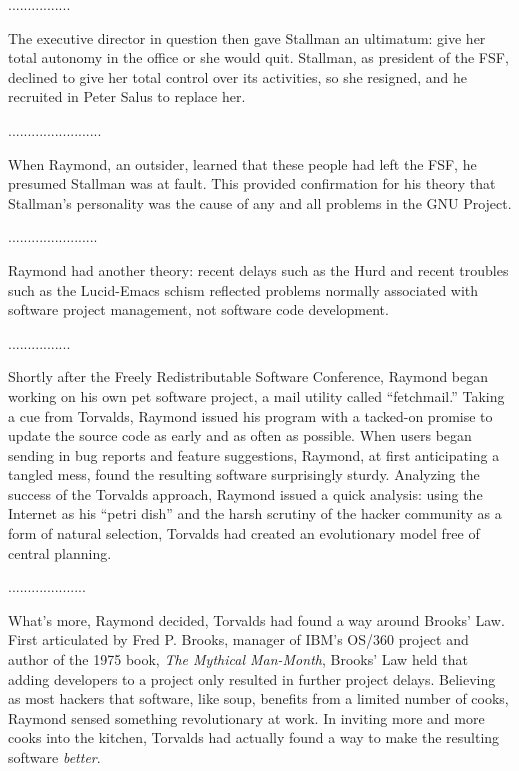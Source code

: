 \ifdefined\chs
................
\fi

\ifdefined\eng
The executive director in question then gave Stallman an ultimatum: give her total autonomy in the office or she would quit.  Stallman, as president of the FSF, declined to give her total control over its activities, so she resigned, and he recruited in Peter Salus to replace her.
\fi

\ifdefined\chs
........................
\fi

\ifdefined\eng
When Raymond, an outsider, learned that these people had left the FSF, he presumed Stallman was at fault.  This provided confirmation for his theory that Stallman's personality was the cause of any and all problems in the GNU Project.
\fi

\ifdefined\chs
.......................
\fi

\ifdefined\eng
Raymond had another theory: recent delays such as the Hurd and recent troubles such as the Lucid-Emacs schism reflected problems normally associated with software project management, not software code development.
\fi

\ifdefined\chs
................
\fi

\ifdefined\eng
Shortly after the Freely Redistributable Software Conference, Raymond began working on his own pet software project, a mail utility called ``fetchmail.'' Taking a cue from Torvalds, Raymond issued his program with a tacked-on promise to update the source code as early and as often as possible. When users began sending in bug reports and feature suggestions, Raymond, at first anticipating a tangled mess, found the resulting software surprisingly sturdy. Analyzing the success of the Torvalds approach, Raymond issued a quick analysis: using the Internet as his ``petri dish'' and the harsh scrutiny of the hacker community as a form of natural selection, Torvalds had created an evolutionary model free of central planning.
\fi

\ifdefined\chs
....................
\fi

\ifdefined\eng
What's more, Raymond decided, Torvalds had found a way around Brooks' Law. First articulated by Fred P. Brooks, manager of IBM's OS/360 project and author of the 1975 book, \textit{The Mythical Man-Month}, Brooks' Law held that adding developers to a project only resulted in further project delays. Believing as most hackers that software, like soup, benefits from a limited number of cooks, Raymond sensed something revolutionary at work. In inviting more and more cooks into the kitchen, Torvalds had actually found a way to make the resulting software \textit{better}.
\fi

